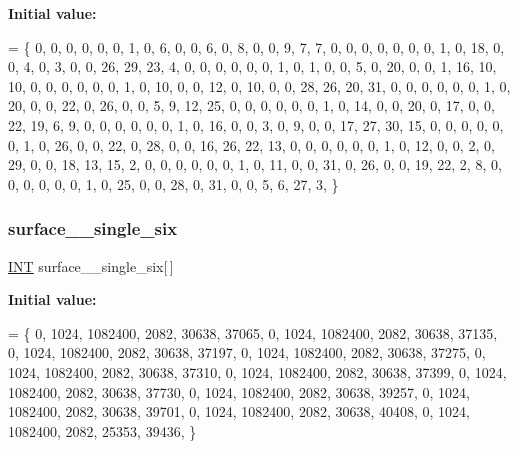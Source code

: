 {\bfseries Initial value\+:}
\begin{DoxyCode}
= \{
    0, 0, 0, 0, 0, 0, 1, 0, 6, 0, 0, 6, 0, 8, 0, 0, 9, 7, 7, 0, 
    0, 0, 0, 0, 0, 0, 1, 0, 18, 0, 0, 4, 0, 3, 0, 0, 26, 29, 23, 4, 
    0, 0, 0, 0, 0, 0, 1, 0, 1, 0, 0, 5, 0, 20, 0, 0, 1, 16, 10, 10, 
    0, 0, 0, 0, 0, 0, 1, 0, 10, 0, 0, 12, 0, 10, 0, 0, 28, 26, 20, 31, 
    0, 0, 0, 0, 0, 0, 1, 0, 20, 0, 0, 22, 0, 26, 0, 0, 5, 9, 12, 25, 
    0, 0, 0, 0, 0, 0, 1, 0, 14, 0, 0, 20, 0, 17, 0, 0, 22, 19, 6, 9, 
    0, 0, 0, 0, 0, 0, 1, 0, 16, 0, 0, 3, 0, 9, 0, 0, 17, 27, 30, 15, 
    0, 0, 0, 0, 0, 0, 1, 0, 26, 0, 0, 22, 0, 28, 0, 0, 16, 26, 22, 13, 
    0, 0, 0, 0, 0, 0, 1, 0, 12, 0, 0, 2, 0, 29, 0, 0, 18, 13, 15, 2, 
    0, 0, 0, 0, 0, 0, 1, 0, 11, 0, 0, 31, 0, 26, 0, 0, 19, 22, 2, 8, 
    0, 0, 0, 0, 0, 0, 1, 0, 25, 0, 0, 28, 0, 31, 0, 0, 5, 6, 27, 3, 
\}
\end{DoxyCode}
\mbox{\label{surface__32_8_c_ae0dcc68a7bd2804c27a3eaa97b8d38dc}} 
\subsubsection{\texorpdfstring{surface\+\_\+\_\+single\+\_\+six}{surface\_32\_single\_six}}
{\footnotesize\ttfamily \mbox{\hyperlink{galois_8h_a09fddde158a3a20bd2dcadb609de11dc}{I\+NT}} surface\+\_\+\_\+single\+\_\+six\mbox{[}$\,$\mbox{]}}

{\bfseries Initial value\+:}
\begin{DoxyCode}
= \{ 
    0, 1024, 1082400, 2082, 30638, 37065, 
    0, 1024, 1082400, 2082, 30638, 37135, 
    0, 1024, 1082400, 2082, 30638, 37197, 
    0, 1024, 1082400, 2082, 30638, 37275, 
    0, 1024, 1082400, 2082, 30638, 37310, 
    0, 1024, 1082400, 2082, 30638, 37399, 
    0, 1024, 1082400, 2082, 30638, 37730, 
    0, 1024, 1082400, 2082, 30638, 39257, 
    0, 1024, 1082400, 2082, 30638, 39701, 
    0, 1024, 1082400, 2082, 30638, 40408, 
    0, 1024, 1082400, 2082, 25353, 39436, 
\}
\end{DoxyCode}
\mbox{\label{surface__32_8_c_afed91ecb1bbab51c2317bed567567703}} 
